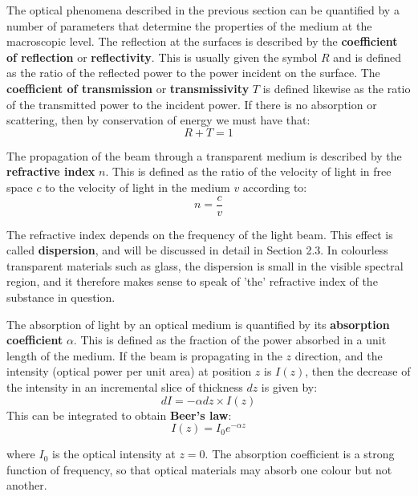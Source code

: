 \documentclass[12pt]{book}
\begin{document}
The optical phenomena described in the previous section can be quantified by a number of parameters that determine the properties of the medium at the macroscopic level.
The reflection at the surfaces is described by the \textbf{coefficient of reflection} or \textbf{reflectivity}. This is usually given the symbol $R$ and is defined as the ratio of the reflected power to the power incident on the surface. The \textbf{coefficient of transmission} or \textbf{transmissivity} $T$ is defined likewise as the ratio of the transmitted power to the incident power. If there is no absorption or scattering, then by conservation of energy we must have that:
\begin{equation}\label{equa:1.1}
  R+T=1
\end{equation}

The propagation of the beam through a transparent medium is described by the \textbf{refractive index} $n$. This is defined as the ratio of the velocity of light in free space $c$ to the velocity of light in the medium $v$ according to:
\begin{equation}\label{equa:1.2}
  n=\frac{c}{v}
\end{equation}

The refractive index depends on the frequency of the light beam. This effect is called \textbf{dispersion}, and will be discussed in detail in Section 2.3. In colourless transparent materials such as glass, the dispersion is small in the visible spectral region, and it therefore makes sense to speak of 'the' refractive index of the substance in question.

The absorption of light by an optical medium is quantified by its \textbf{absorption coefficient} $\alpha$. This is defined as the fraction of the power absorbed in a unit length of the medium. If the beam is propagating in the $z$ direction, and the intensity (optical power per unit area) at position $z$ is $I(z)$, then the decrease of the intensity in an incremental slice of thickness $dz$ is given by:
\begin{equation}\label{equa:1.3}
  dI=-\alpha dz\times I(z)
\end{equation}
This can be integrated to obtain \textbf{Beer's law}:
\begin{equation}\label{equa:1.4}
  I(z)=I_0e^{-\alpha z}
\end{equation}

where $I_0$ is the optical intensity at $z = 0$. The absorption coefficient is a strong function of frequency, so that optical materials may absorb one colour but not
another.
\end{document}
